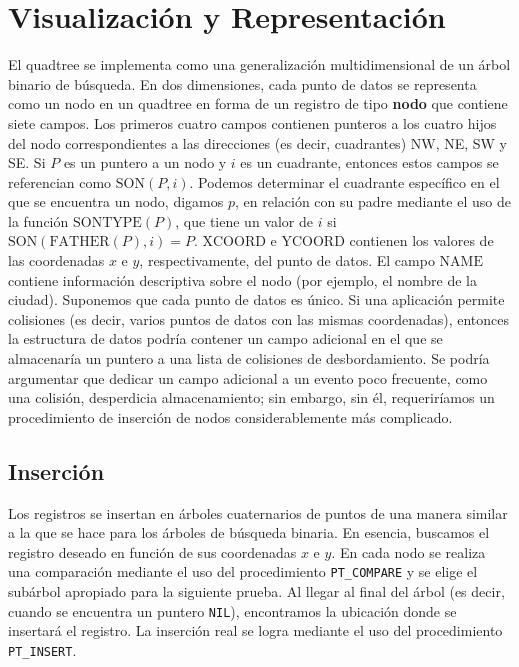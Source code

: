 \documentclass[9pt,a4paper,twoside]{rho-class/rho}
\begin{document}
    \section{Visualización y Representación}
        El quadtree se implementa como una generalización multidimensional de un árbol binario de búsqueda. En dos dimensiones, cada punto de datos se representa como un nodo en un quadtree en forma de un registro de tipo \textbf{nodo} que contiene siete campos. Los primeros cuatro campos contienen punteros a los cuatro hijos del nodo correspondientes a las direcciones (es decir, cuadrantes) NW, NE, SW y SE. Si $P$ es un puntero a un nodo y $i$ es un cuadrante, entonces estos campos se referencian como $\text{SON}(P, i)$. Podemos determinar el cuadrante específico en el que se encuentra un nodo, digamos $p$, en relación con su padre mediante el uso de la función $\text{SONTYPE}(P)$, que tiene un valor de $i$ si $\text{SON}(\text{FATHER}(P),i) = P$.
        $\text{XCOORD}$ e $\text{YCOORD}$ contienen los valores de las coordenadas $x$ e $y$, respectivamente, del punto de datos. El campo $\text{NAME}$ contiene información descriptiva sobre el nodo (por ejemplo, el nombre de la ciudad). Suponemos que cada punto de datos es único. Si una aplicación permite colisiones (es decir, varios puntos de datos con las mismas coordenadas), entonces la estructura de datos podría contener un campo adicional en el que se almacenaría un puntero a una lista de colisiones de desbordamiento. Se podría argumentar que dedicar un campo adicional a un evento poco frecuente, como una colisión, desperdicia almacenamiento; sin embargo, sin él, requeriríamos un procedimiento de inserción de nodos considerablemente más complicado.

        \subsection{Inserción}
            Los registros se insertan en árboles cuaternarios de puntos de una manera similar a la que se hace para los árboles de búsqueda binaria. En esencia, buscamos el registro deseado en función de sus coordenadas \(x\) e \(y\). En cada nodo se realiza una comparación mediante el uso del procedimiento \texttt{PT\_COMPARE} y se elige el subárbol apropiado para la siguiente prueba. Al llegar al final del árbol (es decir, cuando se encuentra un puntero \texttt{NIL}), encontramos la ubicación donde se insertará el registro. La inserción real se logra mediante el uso del procedimiento \texttt{PT\_INSERT}.
        
\end{document}

